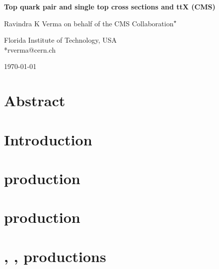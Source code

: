 \documentclass[11pt,twoside,a4paper,cr,final]{cms-tdr}
\begin{document}


\begin{center}{\Large \textbf{
            Top quark pair and single top cross sections and ttX (CMS)\\
}}\end{center}
\begin{center}
Ravindra K Verma on behalf of the CMS Collaboration\textsuperscript{$\star$} 
\end{center}
\begin{center}
Florida Institute of Technology, USA 
\\
*rverma@cern.ch 
\end{center}
\begin{center}
\today
\end{center}



\section*{Abstract}


\section{Introduction}
\label{sec:intro}


\section{\texorpdfstring{\ttbar}{ttbar} production}

\label{sec:tt}

\section{\texorpdfstring{\tW}{tW} production} 

\label{sec:tW}

\section{\texorpdfstring{\ttgamma, \ttcc, \ttbb}{ttXX} productions}

\label{sec:ttX}

%

\end{document}
